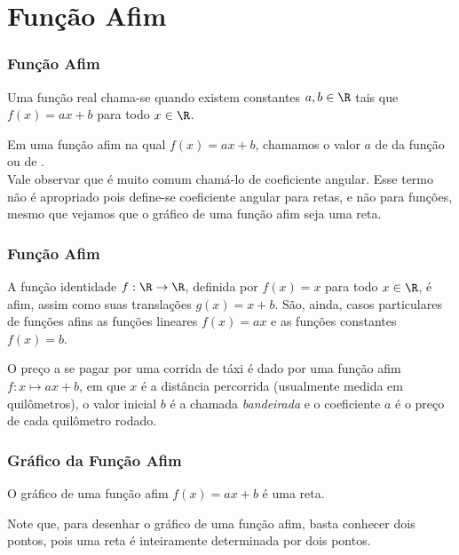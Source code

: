\documentclass[10pt]{beamer}
\begin{document}
\section{Função Afim}
\begin{frame}
\frametitle{Função Afim} 

\begin{definicao}
Uma função real chama-se  quando existem constantes $a, b
\in \R$ tais que $f(x) = ax +b$ para todo $x\in \R$.
\end{definicao}

Em uma função afim na qual $f(x) = ax +b$, chamamos o valor $a$ de
 da função ou de .\\
Vale observar que é muito comum chamá-lo de coeficiente angular.
Esse termo não é apropriado pois define-se coeficiente angular para
retas, e não para funções, mesmo que vejamos que o gráfico de uma
função afim seja uma reta.

\end{frame}


\begin{frame}
\frametitle{Função Afim} 

\begin{exemplo}
A função identidade $f: \R \to \R$, definida por $f(x) = x$ para
todo $x \in \R$, é afim, assim como suas translações $g(x) = x+b$.
São, ainda, casos particulares de funções afins as funções lineares
$f(x) = ax$ e as funções constantes $f(x) = b$.
\end{exemplo}\pause

\begin{exemplo}
O preço a se pagar por uma corrida de táxi é dado por uma função
afim $f: x \mapsto ax+b$, em que $x$ é a distância percorrida
(usualmente medida em quilômetros), o valor inicial $b$ é a chamada
\emph{bandeirada} e o coeficiente $a$ é o preço de cada quilômetro
rodado.
\end{exemplo}

\end{frame}


\begin{frame}
\frametitle{Gráfico da Função Afim} 
\begin{proposicao}
O gráfico de uma função afim $f(x) = ax + b$ é uma reta.
\end{proposicao}\pause
Note que, para desenhar o gráfico de uma função afim, basta conhecer
dois pontos, pois uma reta é inteiramente determinada por dois
pontos.

\end{frame}
\end{document}
